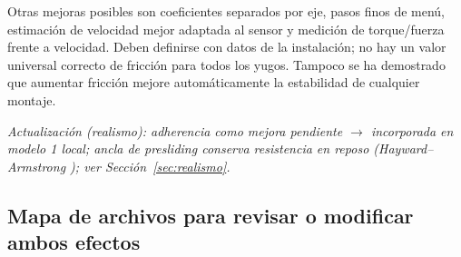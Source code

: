 Otras mejoras posibles son coeficientes separados por eje, pasos finos de menú, estimación de velocidad mejor adaptada al sensor y medición de torque/fuerza frente a velocidad. Deben definirse con datos de la instalación; no hay un valor universal correcto de fricción para todos los yugos. Tampoco se ha demostrado que aumentar fricción mejore automáticamente la estabilidad de cualquier montaje.

\textit{Actualización (realismo): adherencia como mejora pendiente $\rightarrow$ incorporada en modelo 1 local; ancla de presliding conserva resistencia en reposo (Hayward--Armstrong \cite{hayward2000}); ver Sección~\ref{sec:realismo}.}

\subsection{Mapa de archivos para revisar o modificar ambos efectos}
